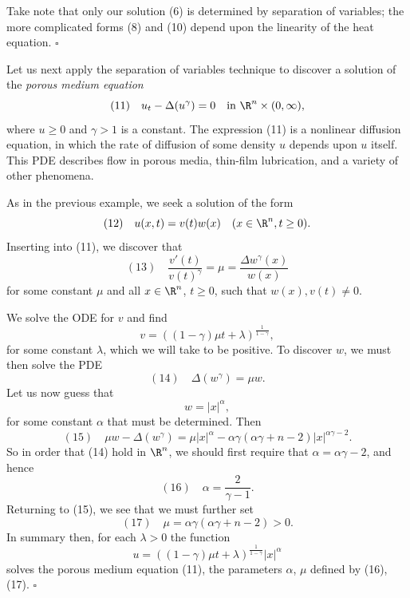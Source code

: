 \begin{remark}
\label{rem:separation-of-variables-linearity-remark}
Take note that only our solution (6) is determined by separation of variables; the more complicated forms (8) and (10) depend upon the linearity of the heat equation. $\square$
\end{remark}

\begin{example}
\label{ex:porous-medium-separation-of-variables}
Let us next apply the separation of variables technique to discover a solution of the \textit{porous medium equation}
$$(11) \quad u_t - \Delta(u^\gamma) = 0 \quad \text{in } \R^n \times (0, \infty),$$
where $u \ge 0$ and $\gamma > 1$ is a constant. The expression (11) is a nonlinear diffusion equation, in which the rate of diffusion of some density $u$ depends upon $u$ itself. This PDE describes flow in porous media, thin-film lubrication, and a variety of other phenomena.

As in the previous example, we seek a solution of the form
$$(12) \quad u(x,t) = v(t)w(x) \quad (x \in \R^n, t \ge 0).$$
Inserting into (11), we discover that
$$(13) \quad \frac{v'(t)}{v(t)^\gamma} = \mu = \frac{\Delta w^\gamma(x)}{w(x)}$$
for some constant $\mu$ and all $x \in \R^n$, $t \ge 0$, such that $w(x), v(t) \ne 0$.

We solve the ODE for $v$ and find
$$v = ((1 - \gamma)\mu t + \lambda)^{\frac{1}{1-\gamma}},$$
for some constant $\lambda$, which we will take to be positive. To discover $w$, we must then solve the PDE
$$(14) \quad \Delta(w^\gamma) = \mu w.$$
Let us now guess that
$$w = |x|^\alpha,$$
for some constant $\alpha$ that must be determined. Then
$$(15) \quad \mu w - \Delta(w^\gamma) = \mu|x|^\alpha - \alpha\gamma(\alpha\gamma + n - 2)|x|^{\alpha\gamma - 2}.$$
So in order that (14) hold in $\R^n$, we should first require that $\alpha = \alpha\gamma - 2$, and hence
$$(16) \quad \alpha = \frac{2}{\gamma - 1}.$$
Returning to (15), we see that we must further set
$$(17) \quad \mu = \alpha\gamma(\alpha\gamma + n - 2) > 0.$$
In summary then, for each $\lambda > 0$ the function
$$u = ((1 - \gamma)\mu t + \lambda)^{\frac{1}{1-\gamma}}|x|^\alpha$$
solves the porous medium equation (11), the parameters $\alpha$, $\mu$ defined by (16), (17). $\square$
\end{example}

